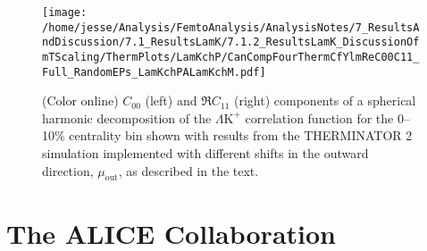 \documentclass[ALICE,manyauthors]{cernphprep}
\newcommand{\LamKchP}{$\Lambda\mathrm{K^{+}}$\xspace}
\begin{document}
\begin{figure}[h]
  \centering
  \texttt{[image: /home/jesse/Analysis/FemtoAnalysis/AnalysisNotes/7\_ResultsAndDiscussion/7.1\_ResultsLamK/7.1.2\_ResultsLamK\_DiscussionOfmTScaling/ThermPlots/LamKchP/CanCompFourThermCfYlmReC00C11\_Full\_RandomEPs\_LamKchPALamKchM.pdf]}
  \caption[\LamKchP $C_{00}$ and $\Re C_{11}$ Spherical Harmonic Components (0--10\%) with THERMINATOR 2 ($b = 2$ fm]
  {
  {\color{blue}{NEW FIGURE}}
  (Color online) $C_{00}$ (left) and $\Re C_{11}$ (right) components of a spherical harmonic decomposition of the \LamKchP correlation function for the 0--10\% centrality bin shown with results from the THERMINATOR 2 simulation implemented with different shifts in the outward direction, $\mu_{\mathrm{out}}$, as described in the text.
  }
  \label{fig:LamKchP_ThermSources_VaryMuOut_SH}
\end{figure}






\clearpage


\section{The ALICE Collaboration}
\label{app:collab}
\end{document}
